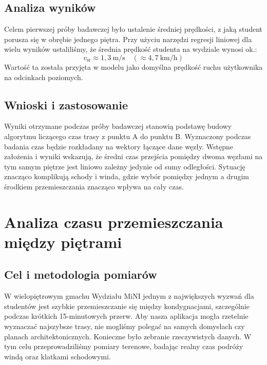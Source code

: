 \documentclass[14pt,a4paper]{extarticle}
\begin{document}
\subsection{Analiza wyników}
Celem pierwszej próby badawczej było ustalenie średniej prędkości, z jaką student porusza się w obrębie jednego piętra. Przy użyciu narzędzi regresji liniowej dla wielu wyników ustaliliśmy, że średnia prędkość studenta na wydziale wynosi ok.:
\begin{equation}
    v_{\text{sr}} \approx 1{,}3\ \text{m/s} \quad (\approx 4{,}7\ \text{km/h})
\end{equation}
Wartość ta została przyjęta w modelu jako domyślna prędkość ruchu użytkownika na odcinkach poziomych.

\subsection{Wnioski i zastosowanie}
Wyniki otrzymane podczas próby badawczej stanowią podstawę budowy algorytmu liczącego czas trasy z punktu A do punktu B. Wyznaczony podczas badania czas będzie rozkładany na wektory łączące dane węzły. Wstępne założenia i wyniki wskazują, że średni czas przejścia pomiędzy dwoma węzłami na tym samym piętrze jest liniowo zależny jedynie od sumy odległości. Sytuację znacząco komplikują schody i winda, gdzie wybór pomiędzy jednym a drugim środkiem przemieszczania znacząco wpływa na cały czas.

\section{Analiza czasu przemieszczania między piętrami}

\subsection{Cel i metodologia pomiarów}
W wielopiętrowym gmachu Wydziału MiNI jednym z największych wyzwań dla studentów jest szybkie przemieszczanie się między kondygnacjami, szczególnie podczas krótkich 15-minutowych przerw. Aby nasza aplikacja mogła rzetelnie wyznaczać najszybsze trasy, nie mogliśmy polegać na samych domysłach czy planach architektonicznych. Konieczne było zebranie rzeczywistych danych. W tym celu przeprowadziliśmy pomiary terenowe, badając realny czas podróży windą oraz klatkami schodowymi.
\end{document}
